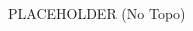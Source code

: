 \begin{multicols}{2}
\begin{minipage}{\linewidth}
					\begin{adjustwidth}{0.5cm}{}				
					PLACEHOLDER
						\newline (No Topo) 
					\end{adjustwidth}
					\end{minipage}
\end{multicols}
\clearpage